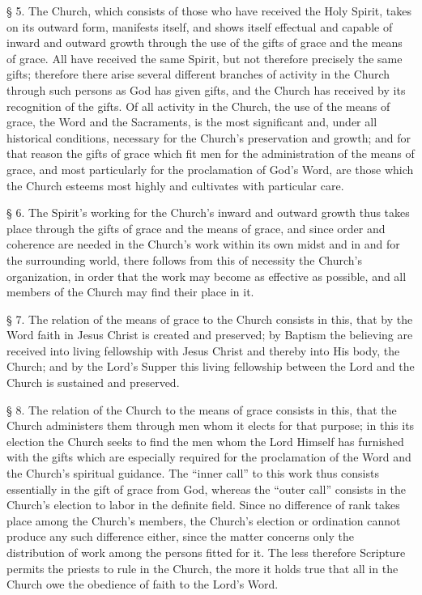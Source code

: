 § 5. The Church, which consists of those who have received the Holy Spirit, takes on its outward form, manifests itself, and shows itself effectual and capable of inward and outward growth through the use of the gifts of grace and the means of grace. All have received the same Spirit, but not therefore precisely the same gifts; therefore there arise several different branches of activity in the Church through such persons as God has given gifts, and the Church has received by its recognition of the gifts. Of all activity in the Church, the use of the means of grace, the Word and the Sacraments, is the most significant and, under all historical conditions, necessary for the Church’s preservation and growth; and for that reason the gifts of grace which fit men for the administration of the means of grace, and most particularly for the proclamation of God’s Word, are those which the Church esteems most highly and cultivates with particular care.

§ 6. The Spirit’s working for the Church’s inward and outward growth thus takes place through the gifts of grace and the means of grace, and since order and coherence are needed in the Church’s work within its own midst and in and for the surrounding world, there follows from this of necessity the Church’s organization, in order that the work may become as effective as possible, and all members of the Church may find their place in it.

§ 7. The relation of the means of grace to the Church consists in this, that by the Word faith in Jesus Christ is created and preserved; by Baptism the believing are received into living fellowship with Jesus Christ and thereby into His body, the Church; and by the Lord’s Supper this living fellowship between the Lord and the Church is sustained and preserved.

§ 8. The relation of the Church to the means of grace consists in this, that the Church administers them through men whom it elects for that purpose; in this its election the Church seeks to find the men whom the Lord Himself has furnished with the gifts which are especially required for the proclamation of the Word and the Church’s spiritual guidance. The “inner call” to this work thus consists essentially in the gift of grace from God, whereas the “outer call” consists in the Church’s election to labor in the definite field. Since no difference of rank takes place among the Church’s members, the Church’s election or ordination cannot produce any such difference either, since the matter concerns only the distribution of work among the persons fitted for it. The less therefore Scripture permits the priests to rule in the Church, the more it holds true that all in the Church owe the obedience of faith to the Lord’s Word.

